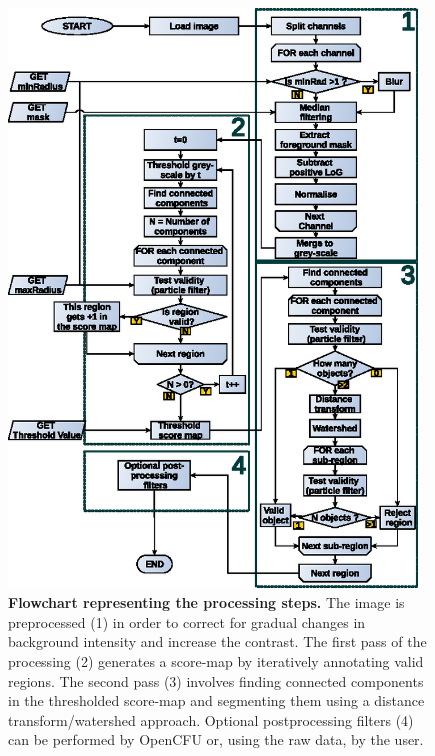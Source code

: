 \documentclass[10pt]{article}
\begin{document}
\begin{figure}[!ht]
\begin{center}
\includegraphics[width=4.27in]{./fig1.eps}
\end{center}
\caption{{\bf Flowchart representing the processing steps.}
The image is preprocessed (1) in order to correct for gradual
changes in background intensity and increase the contrast.
The first pass of the processing (2) generates a score-map by iteratively annotating valid regions.
The second pass (3) involves finding connected components in the thresholded score-map and segmenting them using a distance transform/watershed approach.
Optional postprocessing filters (4) can be performed by OpenCFU or, using the raw data, by the user. 
}
\label{figFlowChart}
\end{figure}



\newpage{}
\end{document}
